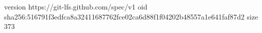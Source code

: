 version https://git-lfs.github.com/spec/v1
oid sha256:516791f3edfca8a32411687762fce02ca6d88f1f04202b48557a1e641faf87d2
size 373
